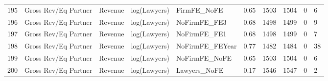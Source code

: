 \documentclass{article}
\begin{document}
\begin{table}[H]
\begin{tabular}{rlllllllll}
  195 & Gross Rev/Eq Partner & Revenue & log(Lawyers) & FirmFE\_NoFE & 0.65 & 1503 & 1504 & 0 & 6 \\ 
  196 & Gross Rev/Eq Partner & Revenue & log(Lawyers) & NoFirmFE\_FE3 & 0.68 & 1498 & 1499 & 0 & 9 \\ 
  197 & Gross Rev/Eq Partner & Revenue & log(Lawyers) & NoFirmFE\_FE1 & 0.68 & 1498 & 1499 & 0 & 7 \\ 
  198 & Gross Rev/Eq Partner & Revenue & log(Lawyers) & NoFirmFE\_FEYear & 0.77 & 1482 & 1484 & 0 & 38 \\ 
  199 & Gross Rev/Eq Partner & Revenue & log(Lawyers) & NoFirmFE\_NoFE & 0.65 & 1503 & 1504 & 0 & 6 \\ 
  200 & Gross Rev/Eq Partner & Revenue & log(Lawyers) & Lawyers\_NoFE & 0.17 & 1546 & 1547 & 0 & 2 \\ 
   \hline
\end{tabular}
\end{table}
\end{document}
